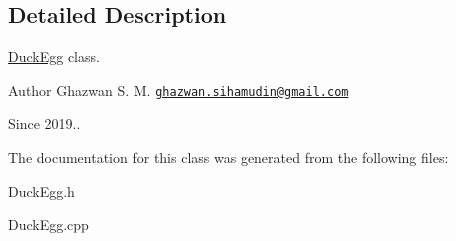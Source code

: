 \subsection{Detailed Description}
\hyperlink{classDuckEgg}{Duck\+Egg} class.

\begin{DoxyAuthor}{Author}
Ghazwan S. M. \href{mailto:ghazwan.sihamudin@gmail.com}{\tt ghazwan.\+sihamudin@gmail.\+com} 
\end{DoxyAuthor}
\begin{DoxySince}{Since}
2019.. 
\end{DoxySince}


The documentation for this class was generated from the following files\+:\begin{DoxyCompactItemize}
\item 
Duck\+Egg.\+h\item 
Duck\+Egg.\+cpp\end{DoxyCompactItemize}
